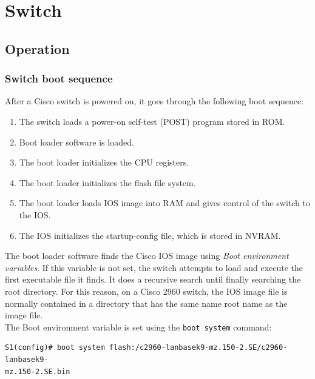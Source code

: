 \chapter{Switch}

\section{Operation}

\subsection{Switch boot sequence}

After a Cisco switch is powered on, it goes through the following boot sequence:

\begin{enumerate}
\item The switch loads a power-on self-test (POST) program stored in ROM.

\item Boot loader software is loaded.

\item The boot loader initializes the CPU registers.

\item The boot loader initializes the flash file system.

\item The boot loader loads IOS image into RAM and gives control of the switch to the IOS.

\item The IOS initializes the startup-config file, which is stored in NVRAM.
\end{enumerate}

The boot loader software finds the Cisco IOS image using \emph{Boot environment variables}. If this variable is not set, the switch attempts to load and execute the first executable file it finds. It does a recursive search until finally searching the root directory. For this reason, on a Cisco 2960 switch, the IOS image file is normally contained in a directory that has the same
name root name as the image file.\\

The Boot environment variable is set using the \verb|boot system| command:

\begin{verbatim}
S1(config)# boot system flash:/c2960-lanbasek9-mz.150-2.SE/c2960-lanbasek9-
mz.150-2.SE.bin
\end{verbatim}

